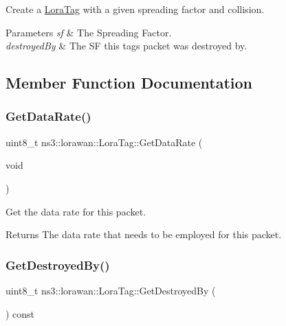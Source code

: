 Create a \hyperlink{classns3_1_1lorawan_1_1LoraTag}{Lora\+Tag} with a given spreading factor and collision.


\begin{DoxyParams}{Parameters}
{\em sf} & The Spreading Factor. \\
\hline
{\em destroyed\+By} & The SF this tag\textquotesingle{}s packet was destroyed by. \\
\hline
\end{DoxyParams}


\subsection{Member Function Documentation}
\mbox{\label{classns3_1_1lorawan_1_1LoraTag_a23f8237d7bf360dc2a24496c904cbaab}} 
\subsubsection{\texorpdfstring{Get\+Data\+Rate()}{GetDataRate()}}
{\footnotesize\ttfamily uint8\+\_\+t ns3\+::lorawan\+::\+Lora\+Tag\+::\+Get\+Data\+Rate (\begin{DoxyParamCaption}\item[{void}]{ }\end{DoxyParamCaption})}

Get the data rate for this packet.

\begin{DoxyReturn}{Returns}
The data rate that needs to be employed for this packet. 
\end{DoxyReturn}
\mbox{\label{classns3_1_1lorawan_1_1LoraTag_a40689221c88be9ac02b847c131e7b755}} 
\subsubsection{\texorpdfstring{Get\+Destroyed\+By()}{GetDestroyedBy()}}
{\footnotesize\ttfamily uint8\+\_\+t ns3\+::lorawan\+::\+Lora\+Tag\+::\+Get\+Destroyed\+By (\begin{DoxyParamCaption}{ }\end{DoxyParamCaption}) const}

